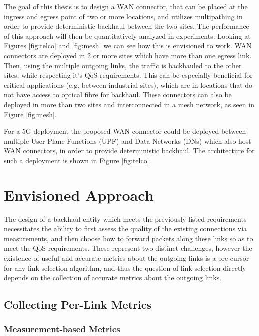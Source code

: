 The goal of this thesis is to design a WAN connector, that can be placed at the ingress and egress point of two or more locations, and utilizes multipathing in order to provide deterministic backhaul between the two sites. The performance of this approach will then be quantitatively analyzed in experiments. Looking at Figures \ref{fig:telco} and \ref{fig:mesh} we can see how this is envisioned to work. WAN connectors are deployed in 2 or more sites which have more than one egress link. Then, using the multiple outgoing links, the traffic is backhauled to the other sites, while respecting it's QoS requirements. This can be especially beneficial for critical applications (e.g. between industrial sites), which are in locations that do not have access to optical fibre for backhaul. These connectors can also be deployed in more than two sites and interconnected in a mesh network, as seen in Figure \ref{fig:mesh}.

For a 5G deployment the proposed WAN connector could be deployed between multiple User Plane Functions (UPF) and Data Networks (DNs) which also host WAN connectors, in order to provide deterministic backhaul. The architecture for such a deployment is shown in Figure \ref{fig:telco}.

\section{Envisioned Approach}

The design of a backhaul entity which meets the previously listed requirements necessitates the ability to first assess the quality of the existing connections via measurements, and then choose how to forward packets along these links so as to meet the QoS requirements. These represent two distinct challenges, however the existence of useful and accurate metrics about the outgoing links is a pre-cursor for any link-selection algorithm, and thus the question of link-selection directly depends on the collection of accurate metrics about the outgoing links.


\subsection{Collecting Per-Link Metrics}

\subsubsection{Measurement-based Metrics}

